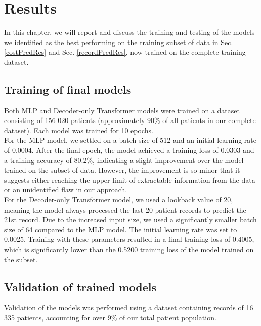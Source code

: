 
\chapter{Results} \label{chap:results}

In this chapter, we will report and discuss the training and testing of the models we identified as the best performing on the training subset of data in Sec. \ref{costPredRes} and Sec. \ref{recordPredRes}, now trained on the complete training dataset.

\section{Training of final models}
\label{modelTrain}

Both MLP and Decoder-only Transformer models were trained on a dataset consisting of 156 020 patients (approximately 90\% of all patients in our complete dataset). Each model was trained for 10 epochs.
\\

For the MLP model, we settled on a batch size of 512 and an initial learning rate of 0.0004. After the final epoch, the model achieved a training loss of 0.0303 and a training accuracy of 80.2\%, indicating a slight improvement over the model trained on the subset of data. However, the improvement is so minor that it suggests either reaching the upper limit of extractable information from the data or an unidentified flaw in our approach.
\\

For the Decoder-only Transformer model, we used a lookback value of 20, meaning the model always processed the last 20 patient records to predict the 21st record. Due to the increased input size, we used a significantly smaller batch size of 64 compared to the MLP model. The initial learning rate was set to 0.0025. Training with these parameters resulted in a final training loss of 0.4005, which is significantly lower than the 0.5200 training loss of the model trained on the subset.

\section{Validation of trained models}
\label{modelValid}

Validation of the models was performed using a dataset containing records of 16 335 patients, accounting for over 9\% of our total patient population.
\\

